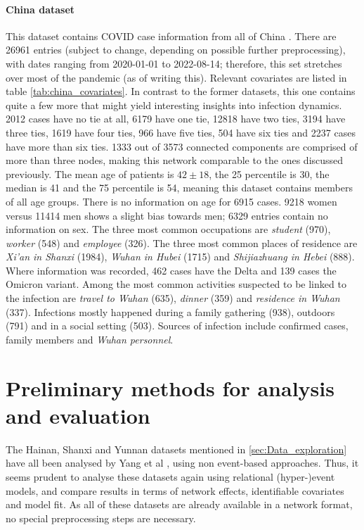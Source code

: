 \documentclass{article}
\begin{document}
	\paragraph{China dataset} This dataset contains COVID case information from all of China \cite{china_publication,china_data}. There are 26961 entries (subject to change, depending on possible further preprocessing), with dates ranging from 2020-01-01 to 2022-08-14; therefore, this set stretches over most of the pandemic (as of writing this). Relevant covariates are listed in table \ref{tab:china_covariates}. In contrast to the former datasets, this one contains quite a few more that might yield interesting insights into infection dynamics. 2012 cases have no tie at all, 6179 have one tie, 12818 have two ties, 3194 have three ties, 1619 have four ties, 966 have five ties, 504 have six ties and 2237 cases have more than six ties. 1333 out of 3573 connected components are comprised of more than three nodes, making this network comparable to the ones discussed previously. The mean age of patients is $42\pm18$, the 25 percentile is 30, the median is 41 and the 75 percentile is 54, meaning this dataset contains members of all age groups. There is no information on age for 6915 cases. 9218 women versus 11414 men shows a slight bias towards men; 6329 entries contain no information on sex. The three most common occupations are \emph{student} (970), \emph{worker} (548) and \emph{employee} (326). The three most common places of residence are \emph{Xi'an in Shanxi} (1984), \emph{Wuhan in Hubei} (1715) and \emph{Shijiazhuang in Hebei} (888). Where information was recorded, 462 cases have the Delta and 139 cases the Omicron variant. Among the most common activities suspected to be linked to the infection are \emph{travel to Wuhan} (635), \emph{dinner} (359) and \emph{residence in Wuhan} (337). Infections mostly happened during a family gathering (938), outdoors (791) and in a social setting (503). Sources of infection include confirmed cases, family members and \emph{Wuhan personnel}.
	
	\section{Preliminary methods for analysis and evaluation}
	\label{sec:Methods}
	The Hainan, Shanxi and Yunnan datasets mentioned in \ref{sec:Data_exploration} have all been analysed by Yang et al \cite{hainan_publication,shanxi_publication}, using non event-based approaches. Thus, it seems prudent to analyse these datasets again using relational (hyper-)event models, and compare results in terms of network effects, identifiable covariates and model fit. As all of these datasets are already available in a network format, no special preprocessing steps are necessary. 
	
\end{document}
